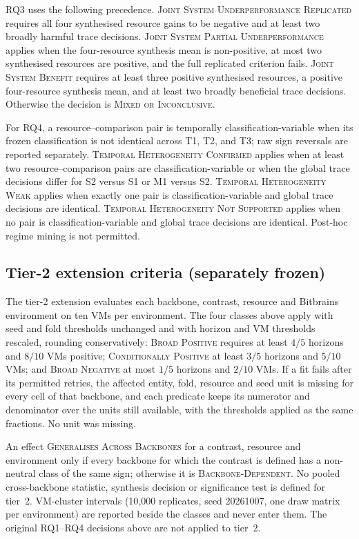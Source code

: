 RQ3 uses the following precedence.  \textsc{Joint System Underperformance
Replicated} requires all four synthesised resource gains to be negative and at
least two broadly harmful trace decisions.  \textsc{Joint System Partial
Underperformance} applies when the four-resource synthesis mean is non-positive,
at most two synthesised resources are positive, and the full replicated
criterion fails.  \textsc{Joint System Benefit} requires at least three
positive synthesised resources, a positive four-resource synthesis mean, and at
least two broadly beneficial trace decisions.  Otherwise the decision is
\textsc{Mixed or Inconclusive}.

For RQ4, a resource--comparison pair is temporally classification-variable when
its frozen classification is not identical across T1, T2, and T3; raw sign
reversals are reported separately.  \textsc{Temporal Heterogeneity Confirmed}
applies when at least two resource--comparison pairs are classification-variable
or when the global trace decisions differ for S2 versus S1 or M1 versus S2.
\textsc{Temporal Heterogeneity Weak} applies when exactly one pair is
classification-variable and global trace decisions are identical.
\textsc{Temporal Heterogeneity Not Supported} applies when no pair is
classification-variable and global trace decisions are identical.  Post-hoc
regime mining is not permitted.

\subsection*{Tier-2 extension criteria (separately frozen)}

The tier-2 extension evaluates each backbone, contrast, resource and Bitbrains
environment on ten VMs per environment. The four classes above apply with seed
and fold thresholds unchanged and with horizon and VM thresholds rescaled,
rounding conservatively: \textsc{Broad Positive} requires at least $4/5$
horizons and $8/10$ VMs positive; \textsc{Conditionally Positive} at least
$3/5$ horizons and $5/10$ VMs; and \textsc{Broad Negative} at most $1/5$
horizons and $2/10$ VMs. If a fit fails after its permitted retries, the
affected entity, fold, resource and seed unit is missing for every cell of
that backbone, and each predicate keeps its numerator and denominator over the
units still available, with the thresholds applied as the same fractions. No
unit was missing.

An effect \textsc{Generalises Across Backbones} for a contrast, resource and
environment only if every backbone for which the contrast is defined has a
non-neutral class of the same sign; otherwise it is \textsc{Backbone-Dependent}.
No pooled cross-backbone statistic, synthesis decision or significance test is
defined for tier~2. VM-cluster intervals (10{,}000 replicates, seed 20261007,
one draw matrix per environment) are reported beside the classes and never
enter them. The original RQ1--RQ4 decisions above are not applied to tier~2.
